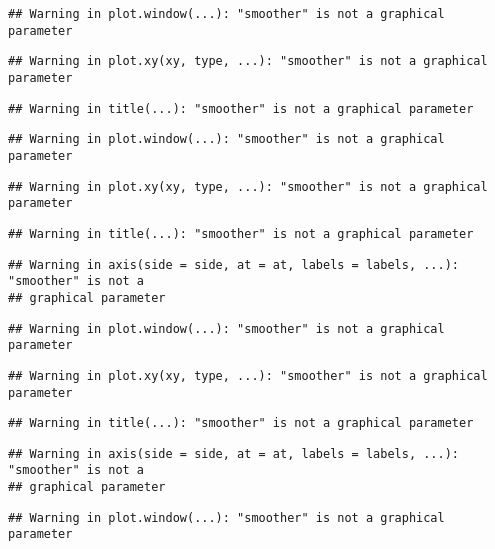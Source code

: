 \documentclass[
]{article}
\begin{document}
\begin{verbatim}
## Warning in plot.window(...): "smoother" is not a graphical parameter
\end{verbatim}

\begin{verbatim}
## Warning in plot.xy(xy, type, ...): "smoother" is not a graphical parameter
\end{verbatim}

\begin{verbatim}
## Warning in title(...): "smoother" is not a graphical parameter
\end{verbatim}

\begin{verbatim}
## Warning in plot.window(...): "smoother" is not a graphical parameter
\end{verbatim}

\begin{verbatim}
## Warning in plot.xy(xy, type, ...): "smoother" is not a graphical parameter
\end{verbatim}

\begin{verbatim}
## Warning in title(...): "smoother" is not a graphical parameter
\end{verbatim}

\begin{verbatim}
## Warning in axis(side = side, at = at, labels = labels, ...): "smoother" is not a
## graphical parameter
\end{verbatim}

\begin{verbatim}
## Warning in plot.window(...): "smoother" is not a graphical parameter
\end{verbatim}

\begin{verbatim}
## Warning in plot.xy(xy, type, ...): "smoother" is not a graphical parameter
\end{verbatim}

\begin{verbatim}
## Warning in title(...): "smoother" is not a graphical parameter
\end{verbatim}

\begin{verbatim}
## Warning in axis(side = side, at = at, labels = labels, ...): "smoother" is not a
## graphical parameter
\end{verbatim}

\begin{verbatim}
## Warning in plot.window(...): "smoother" is not a graphical parameter
\end{verbatim}
\end{document}
